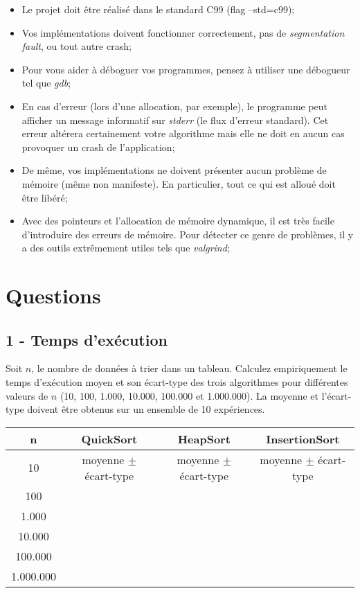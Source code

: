 \documentclass[a4paper,10pt]{article}
\begin{document}
\begin{itemize}
\item Le projet doit être réalisé dans le standard C99 (flag --std=c99);
\item Vos implémentations doivent fonctionner correctement, pas de {\em segmentation fault}, ou tout autre crash;
\item Pour vous aider à déboguer vos programmes, pensez à utiliser une débogueur tel que {\em gdb};
\item En cas d'erreur (lors d'une allocation, par exemple), le programme peut afficher un message informatif sur {\em stderr} (le flux d'erreur standard). Cet erreur altérera certainement votre algorithme mais elle ne doit en aucun cas provoquer un crash de l'application;
\item De même, vos implémentations ne doivent présenter aucun problème de mémoire (même non manifeste). En particulier, tout ce qui est alloué doit être libéré;
\item Avec des pointeurs et l’allocation de mémoire dynamique, il est très facile d’introduire des erreurs de mémoire. Pour détecter ce genre de problèmes, il y a des outils extrêmement utiles tels que {\em valgrind};
\end{itemize}

\section*{Questions}
\subsection*{1 - Temps d'exécution}
Soit $n$, le nombre de données à trier dans un tableau. Calculez empiriquement le temps d'exécution moyen et son écart-type des trois algorithmes pour différentes valeurs de $n$ (10, 100, 1.000, 10.000, 100.000 et 1.000.000). La moyenne et l'écart-type doivent être obtenus sur un ensemble de 10 expériences.
\begin{center}
\begin{tabular}{cccc}
	\hline
	n & QuickSort & HeapSort & InsertionSort \\
	\hline
	10 & moyenne $\pm$ écart-type & moyenne $\pm$ écart-type & moyenne $\pm$ écart-type\\
	100 & & &\\
	1.000 & & &\\
	10.000 & & &\\
	100.000 & & &\\
	1.000.000 & & &\\
\end{tabular}
\end{center}
\end{document}
